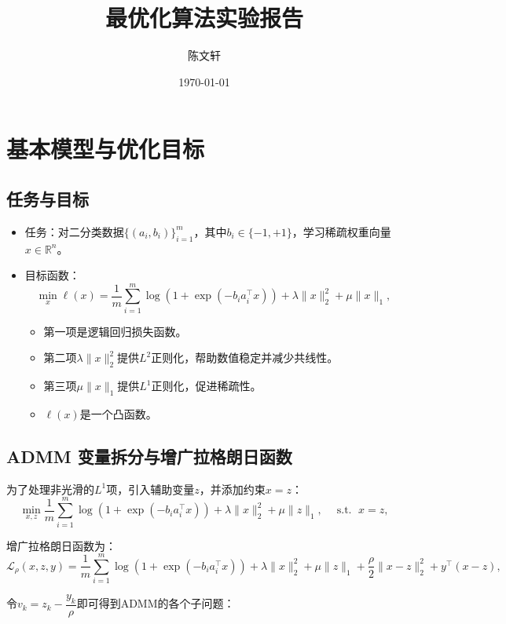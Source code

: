 \documentclass[cn,hazy,black,11pt,normal]{elegantnote}
\title{最优化算法实验报告}
\author{陈文轩}
\date{\today}
\DeclareMathOperator*{\st}{s.t.\,\,}
\begin{document}
\maketitle
    \section{基本模型与优化目标}

        \subsection{任务与目标}

            \begin{itemize}
                \item 任务：对二分类数据$\{(a_i,b_i)\}_{i=1}^m$，其中$b_i\in\{-1,+1\}$，学习稀疏权重向量$x\in\mathbb{R}^n$。
                \item 目标函数：\[\min_x\ell(x)=\dfrac1m\sum_{i=1}^m \log\left(1+\exp\left(-b_i a_i^{\top}x\right)\right)+\lambda\|x\|_2^2+\mu\|x\|_1,\]
                    \begin{itemize}
                        \item 第一项是逻辑回归损失函数。
                        \item 第二项$\lambda\|x\|_2^2$提供$L^2$正则化，帮助数值稳定并减少共线性。
                        \item 第三项$\mu\|x\|_1$提供$L^1$正则化，促进稀疏性。
                        \item $\ell(x)$是一个凸函数。
                    \end{itemize}
            \end{itemize}
    
        \subsection{ADMM 变量拆分与增广拉格朗日函数}

            为了处理非光滑的$L^1$项，引入辅助变量$z$，并添加约束$x=z$：\[\min_{x,z}\dfrac1m\sum_{i=1}^m \log\left(1+\exp\left(-b_i a_i^{\top}x\right)\right)+\lambda\|x\|_2^2+\mu\|z\|_1,\quad\st x=z,\]

            增广拉格朗日函数为：\[\mathcal{L}_{\rho}(x,z,y)=\dfrac1m\sum_{i=1}^m \log\left(1+\exp\left(-b_i a_i^{\top}x\right)\right)+\lambda\|x\|_2^2+\mu\|z\|_1+\dfrac{\rho}2\|x-z\|_2^2+y^{\top}(x-z),\]

            令$v_k=z_k-\dfrac{y_k}{\rho}$即可得到ADMM的各个子问题：
\end{document}
